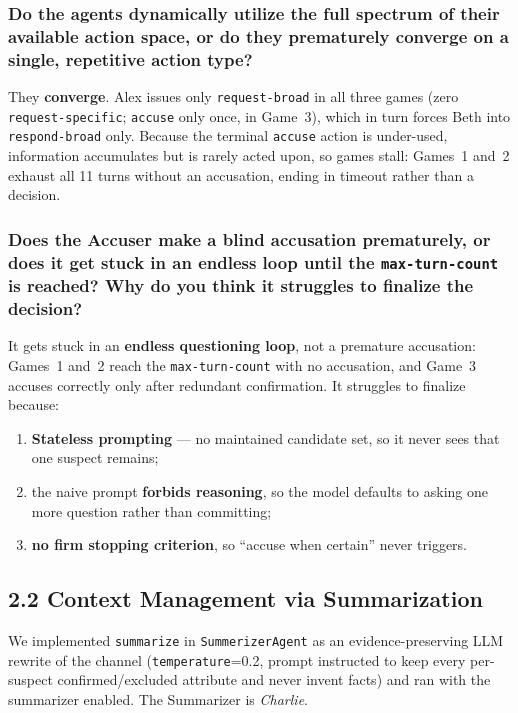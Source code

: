\documentclass{article}
\begin{document}
\subsubsection*{Do the agents dynamically utilize the full spectrum of their available action
space, or do they prematurely converge on a single, repetitive action type?}

They \textbf{converge}. Alex issues only \texttt{request-broad} in all three games (zero
\texttt{request-specific}; \texttt{accuse} only once, in Game~3), which in turn forces Beth
into \texttt{respond-broad} only. Because the terminal \texttt{accuse} action is under-used,
information accumulates but is rarely acted upon, so games stall: Games~1 and~2 exhaust all
11 turns without an accusation, ending in timeout rather than a decision.

\subsubsection*{Does the Accuser make a blind accusation prematurely, or does it get stuck in
an endless loop until the \texttt{max-turn-count} is reached? Why do you think it struggles
to finalize the decision?}

It gets stuck in an \textbf{endless questioning loop}, not a premature accusation: Games~1
and~2 reach the \texttt{max-\allowbreak turn-\allowbreak count} with no accusation, and
Game~3 accuses correctly only after redundant confirmation. It struggles to finalize because:
\begin{enumerate}[leftmargin=1.6em,itemsep=2pt]
  \item \textbf{Stateless prompting} --- no maintained candidate set, so it never sees that
  one suspect remains;
  \item the naive prompt \textbf{forbids reasoning}, so the model defaults to asking one
  more question rather than committing;
  \item \textbf{no firm stopping criterion}, so ``accuse when certain'' never triggers.
\end{enumerate}

\subsection*{2.2 \quad Context Management via Summarization}

We implemented \texttt{summarize} in \texttt{SummerizerAgent} as an evidence-preserving LLM
rewrite of the channel (\texttt{temperature}=0.2, prompt instructed to keep every
per-suspect confirmed/excluded attribute and never invent facts) and ran with the summarizer
enabled. The Summarizer is \emph{Charlie}.
\end{document}
